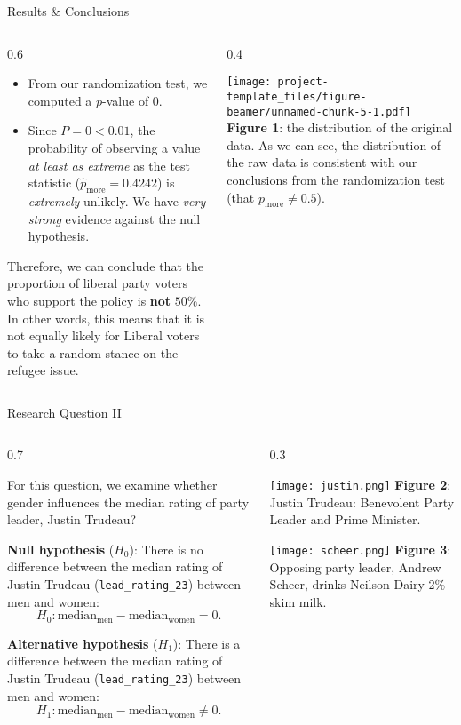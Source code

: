 \documentclass[
  ignorenonframetext,
]{beamer}
\def\begincols{\begin{columns}}
\def\begincol{\begin{column}}
\def\endcol{\end{column}}
\def\endcols{\end{columns}}
\begin{document}
\begin{frame}{Results \& Conclusions}
\protect\hypertarget{results-conclusions}{}

\begincols
\begincol{0.6\textwidth}
\begin{itemize}
\item From our randomization test, we computed a $p$-value of $0$.
\item Since $P=0<0.01$, the probability of observing a value \emph{at least as extreme} as the test statistic ($\hat{p}_\text{more}=0.4242$) is \emph{extremely} unlikely. We have \textit{very strong} evidence against the null hypothesis.
\end{itemize}
\vspace{1em}

Therefore, we can conclude that the proportion of liberal party voters
who support the policy is \textbf{not} \(50\%\). In other words, this
means that it is not equally likely for Liberal voters to take a random
stance on the refugee issue.

\endcol
\begincol{0.4\textwidth}
\fontsize{6}{7.2}\selectfont

\texttt{[image: project-template\_files/figure-beamer/unnamed-chunk-5-1.pdf]}
\textbf{Figure 1}: the distribution of the original data. As we can see,
the distribution of the raw data is consistent with our conclusions from
the randomization test (that \(p_\text{more}\neq 0.5\)).

\endcol
\endcols

\end{frame}

\begin{frame}[fragile,t]{Research Question II}
\protect\hypertarget{research-question-ii}{}

\begincols
\begincol{0.7\textwidth}

For this question, we examine whether gender influences the median
rating of party leader, Justin Trudeau? \vspace{1em}

\textbf{Null hypothesis} (\(H_0\)): There is no difference between the
median rating of Justin Trudeau (\texttt{lead\_rating\_23}) between men
and women:
\[H_0: \text{median}_\text{men}-\text{median}_\text{women} = 0.\]

\textbf{Alternative hypothesis} (\(H_1\)): There is a difference between
the median rating of Justin Trudeau (\texttt{lead\_rating\_23}) between
men and women:
\[H_1: \text{median}_\text{men}-\text{median}_\text{women} \neq 0.\]
\endcol \begincol{0.3\textwidth} \fontsize{6}{7.2}\selectfont

\texttt{[image: justin.png]}
\textbf{Figure 2}: Justin Trudeau: Benevolent Party Leader and Prime
Minister.

\vspace{2em}

\texttt{[image: scheer.png]}
\textbf{Figure 3}: Opposing party leader, Andrew Scheer, drinks Neilson
Dairy 2\% skim milk.

\endcol
\endcols

\end{frame}
\end{document}
